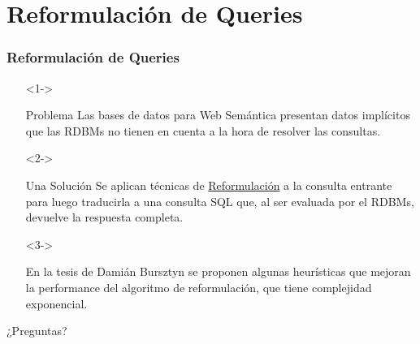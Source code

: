 \documentclass{beamer}
\begin{document}
\section{Reformulación de Queries}
\begin{frame}
\frametitle{Reformulación de Queries}
\begin{itemize}
\item[]<1->\begin{block}{Problema}
Las bases de datos para Web Semántica presentan datos implícitos que las RDBMs no tienen en cuenta a la hora de resolver las consultas.
\end{block}

\item[]<2->\begin{exampleblock}{Una Solución}
Se aplican técnicas de \underline{Reformulación} a la consulta entrante para luego traducirla a una consulta SQL que, al ser evaluada por el RDBMs, devuelve la respuesta completa.
\end{exampleblock}

\item[]<3->\begin{center}
En la tesis de Damián Bursztyn se proponen algunas heurísticas que mejoran la performance del algoritmo de reformulación, que tiene complejidad exponencial.
\end{center}
\end{itemize}
\end{frame}	



\begin{frame}
\Huge{\centerline{¿Preguntas?}}
\end{frame}

\end{document}

